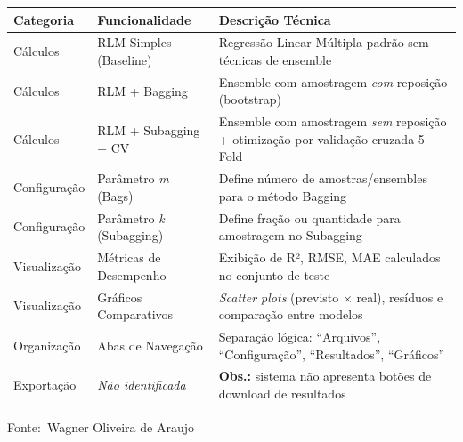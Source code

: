 \documentclass[12pt,a4paper]{article}
\newcommand{\oautor}{Wagner Oliveira de Araujo}
\begin{document}
\begin{quadro}[ht]
\begin{center}
\small
\caption{Inventário das funções do sistema}
\label{quadro:funcoes}
\begin{threeparttable}
\begin{tabularx}{\textwidth}{|l|l|X|} \hline
\textbf{Categoria} & \textbf{Funcionalidade} & \textbf{Descrição Técnica} \\ \hline
Cálculos & RLM Simples (Baseline) & Regressão Linear Múltipla padrão sem técnicas de ensemble \\ \hline
Cálculos & RLM + Bagging & Ensemble com amostragem \textit{com} reposição (bootstrap) \\ \hline
Cálculos & RLM + Subagging + CV & Ensemble com amostragem \textit{sem} reposição + otimização por validação cruzada 5-Fold \\ \hline
Configuração & Parâmetro \textit{m} (Bags) & Define número de amostras/ensembles para o método Bagging \\ \hline
Configuração & Parâmetro \textit{k} (Subagging) & Define fração ou quantidade para amostragem no Subagging \\ \hline
Visualização & Métricas de Desempenho & Exibição de R², RMSE, MAE calculados no conjunto de teste \\ \hline
Visualização & Gráficos Comparativos & \textit{Scatter plots} (previsto $\times$ real), resíduos e comparação entre modelos \\ \hline
Organização & Abas de Navegação & Separação lógica: ``Arquivos'', ``Configuração'', ``Resultados'', ``Gráficos'' \\ \hline
Exportação & \textit{Não identificada} & \textbf{Obs.:} sistema não apresenta botões de download de resultados \\ \hline
\end{tabularx}
\begin{tablenotes}[flushleft]
\footnotesize
\item Fonte:~\oautor
\end{tablenotes}
\end{threeparttable}
\end{center}
\end{quadro}
\end{document}
